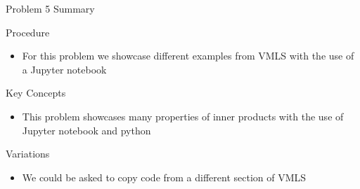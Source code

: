 \begin{summary}{Problem 5 Summary}
    \begin{statement}{Procedure}
        \begin{itemize}
            \item For this problem we showcase different examples from VMLS with the use of a Jupyter notebook
        \end{itemize}
    \end{statement}
    \begin{statement}{Key Concepts}
        \begin{itemize}
            \item This problem showcases many properties of inner products with the use of Jupyter notebook and python
        \end{itemize}
    \end{statement}
    \begin{statement}{Variations}
        \begin{itemize}
            \item We could be asked to copy code from a different section of VMLS
        \end{itemize}
    \end{statement}
\end{summary}